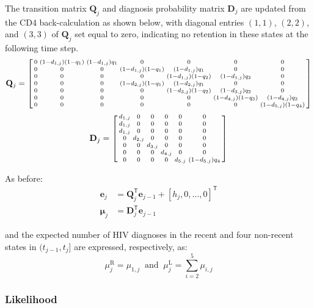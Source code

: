 The transition matrix $\mathbf{Q}_j$ and diagnosis probability matrix $\mathbf{D}_j$ are updated from the CD4 back-calculation as shown below, with diagonal entries $(1,1)$, $(2,2)$, and $(3,3)$ of $\mathbf{Q}_j$ set equal to zero, indicating no retention in these states at the following time step.
%
\[
  \mathbf{Q}_j = \begin{bsmallmatrix}
    0 & (1-d_{1,j})(1-q_1) & (1-d_{1,j})q_1 & 0 & 0 & 0 & 0 \\
    0 & 0 & 0 & (1-d_{1,j})(1-q_1) & (1-d_{1,j})q_1 & 0 & 0 \\
    0 & 0 & 0 & 0 & (1-d_{1,j})(1-q_2) & (1-d_{1,j})q_2 & 0 \\
    0 & 0 & 0 & (1-d_{2,j})(1-q_1) & (1-d_{2,j})q_1 & 0 & 0\\
    0 & 0 & 0 & 0 & (1-d_{3,j})(1-q_2) & (1-d_{3,j})q_2 & 0\\
    0 & 0 & 0 & 0 & 0 & (1-d_{4,j})(1-q_3) & (1-d_{4,j})q_3 \\
    0 & 0 & 0 & 0 & 0 & 0 & (1-d_{5,j})(1-q_4)
  \end{bsmallmatrix}
\]
%
\[
  \mathbf{D}_j = \begin{bsmallmatrix}
    d_{1,j} & 0 & 0 & 0 & 0 & 0 \\
    d_{1,j} & 0 & 0 & 0 & 0 & 0 \\
    d_{1,j} & 0 & 0 & 0 & 0 & 0 \\
    0 & d_{2,j} & 0 & 0 & 0 & 0 \\
    0 & 0 & d_{3,j} & 0 & 0 & 0 \\
    0 & 0 & 0 & d_{4,j} & 0 & 0 \\
    0 & 0 & 0 & 0 & d_{5,j} & (1-d_{5,j})q_4
  \end{bsmallmatrix}
\]

As before:
%
\begin{align*}
  \bm{e}_j   & = \mathbf{Q}_j^\mathsf{T} \bm{e}_{j-1} + {[h_j, 0, \ldots,0]}^\mathsf{T} \\
  \bm{\mu}_j & = \mathbf{D}_j^\mathsf{T} \bm{e}_{j-1}
\end{align*}

and the expected number of HIV diagnoses in the recent and four non-recent states in $(t_{j-1},t_j]$ are expressed, respectively, as:
%
\[
  \mu_j^\text{R} = \mu_{1,j} \: \text{ and } \:
  \mu_j^\text{L} = \sum_{i=2}^5{\mu_{i,j}}
\]

\subsubsection{Likelihood}

